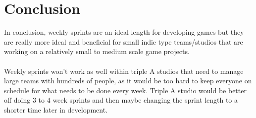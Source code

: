 \documentclass{scrartcl}
\begin{document}
\section{Conclusion}
In conclusion, weekly sprints are an ideal length for developing games but they are really more ideal and beneficial for small indie type teams/studios that are working on a relatively small to medium scale game projects.
\\~\\
Weekly sprints won't work as well within triple A studios that need to manage large teams with hundreds of people, as it would be too hard to keep everyone on schedule for what needs to be done every week. Triple A studio would be better off doing 3 to 4 week sprints and then maybe changing the sprint length to a shorter time later in development.


\end{document}
